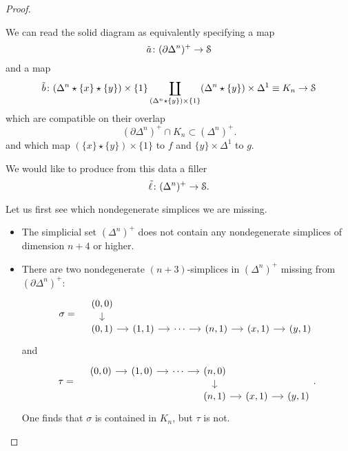 \documentclass[main.tex]{subfiles}
\begin{document}
\begin{proof}
\begin{enumerate}
      We can read the solid diagram as equivalently specifying a map
      \begin{equation*}
        \tilde{a}\colon (\partial \Delta^{n})^{+} \to \S
      \end{equation*}
      and a map
      \begin{equation*}
        \tilde{b}\colon (\Delta^{n} \star \{x\} \star \{y\}) \times \{1\} \coprod_{(\Delta^{n} \star \{y\}) \times \{1\}} (\Delta^{n} \star \{y\}) \times \Delta^{1} \equiv K_{n} \to \S
      \end{equation*}
      which are compatible on their overlap
      \begin{equation*}
        (\partial \Delta^{n})^{+} \cap K_{n} \subset (\Delta^{n})^{+}.
      \end{equation*}
      and which map $(\{x\} \star \{y\}) \times \{1\}$ to $f$ and $\{y\} \times \Delta^{1}$ to $g$.

      We would like to produce from this data a filler
      \begin{equation*}
        \tilde{\ell}\colon (\Delta^{n})^{+} \to \S.
      \end{equation*}

      Let us first see which nondegenerate simplices we are missing.
      \begin{itemize}
        \item The simplicial set $(\Delta^{n})^{+}$ does not contain any nondegenerate simplices of dimension $n+4$ or higher.

        \item There are two nondegenerate $(n+3)$-simplices in $(\Delta^{n})^{+}$ missing from $(\partial \Delta^{n})^{+}$:
          \begin{equation*}
            \sigma = \quad
            \begin{tikzcd}[row sep=small, column sep=small]
              {(0, 0)}
              \arrow[d]
              \\
              {(0, 1)}
              \arrow[r]
              & {(1, 1)}
              \arrow[r]
              & \cdots
              \arrow[r]
              & {(n, 1)}
              \arrow[r]
              & {(x, 1)}
              \arrow[r]
              & {(y, 1)}
            \end{tikzcd}
          \end{equation*}
          and
          \begin{equation*}
            \tau = \quad
            \begin{tikzcd}[row sep=small, column sep=small]
              {(0, 0)}
              \arrow[r]
              & {(1, 0)}
              \arrow[r]
              & \cdots
              \arrow[r]
              & {(n, 0)}
              \arrow[d]
              \\
              &&& {(n, 1)}
              \arrow[r]
              & {(x, 1)}
              \arrow[r]
              & {(y, 1)}
            \end{tikzcd}.
          \end{equation*}
          One finds that $\sigma$ is contained in $K_{n}$, but $\tau$ is not.


\end{itemize}
\end{enumerate}
\end{proof}
\end{document}
